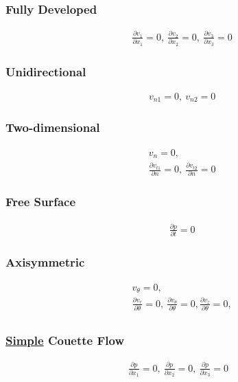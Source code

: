 \documentclass[11pt, letterpaper, notitlepage]{article}
\begin{document}
\subsubsection{Fully Developed}
\begin{align*}
& \frac{\partial v_1}{\partial x_1} = 0,\ \frac{\partial v_2}{\partial x_2} = 0,\ \frac{\partial v_3}{\partial x_3} = 0
\end{align*}

\subsubsection{Unidirectional}
\begin{align*}
& v_{n1} = 0,\ v_{n2} = 0
\end{align*}

\subsubsection{Two-dimensional}
\begin{align*}
& v_{n} = 0,\\
&\frac{\partial v_{t1}}{\partial n} = 0,\ \frac{\partial v_{t2}}{\partial n} = 0
\end{align*}

\subsubsection{Free Surface}
\begin{align*}
& \frac{\partial p}{\partial t} =0
\end{align*}

\subsubsection{Axisymmetric}
\begin{align*}
& v_\theta = 0, \\
& \frac{\partial v_r}{\partial \theta} = 0,\ \frac{\partial v_\theta}{\partial \theta} = 0, \frac{\partial v_z}{\partial \theta} = 0,\\
\end{align*}

\subsubsection{\underline{Simple} Couette Flow}
\begin{align*}
\frac{\partial p}{\partial x_1} = 0,\ \frac{\partial p}{\partial x_2} = 0,\ \frac{\partial p}{\partial x_3} = 0 
\end{align*}
\end{document}
